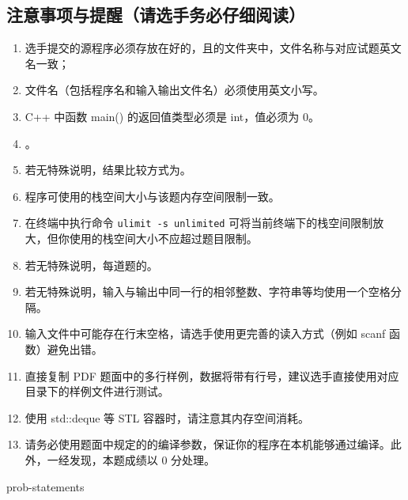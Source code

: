 \documentclass{\string~/.hexagon/assets/statement}
\begin{document}
\begin{titlepage}
  \begingroup\titleformat{\subsection}{\bf}{}{0pt}{\hspace{0.5em}}\subsection[注意事项与提醒]{注意事项与提醒（请选手务必仔细阅读）}\endgroup
  \begin{enumerate}
    \item 选手提交的源程序必须存放在好的，且的文件夹中，文件名称与对应试题英文名一致；
    \item 文件名（包括程序名和输入输出文件名）必须使用英文小写。
    \item C++ 中函数 main() 的返回值类型必须是 int，值必须为 0。
    \item {}。
    \item 若无特殊说明，结果比较方式为。
    \item 程序可使用的栈空间大小与该题内存空间限制一致。
    \item 在终端中执行命令 \texttt{ulimit -s unlimited} 可将当前终端下的栈空间限制放大，但你使用的栈空间大小不应超过题目限制。
    \item 若无特殊说明，每道题的。
    \item 若无特殊说明，输入与输出中同一行的相邻整数、字符串等均使用一个空格分隔。
    \item 输入文件中可能存在行末空格，请选手使用更完善的读入方式（例如 scanf 函数）避免出错。
    \item 直接复制 PDF 题面中的多行样例，数据将带有行号，建议选手直接使用对应目录下的样例文件进行测试。
    \item 使用 std::deque 等 STL 容器时，请注意其内存空间消耗。
    \item 请务必使用题面中规定的的编译参数，保证你的程序在本机能够通过编译。此外，一经发现，本题成绩以 0 分处理。
  \end{enumerate}
\end{titlepage}

\clearpage

{{prob-statements}}
\end{document}
